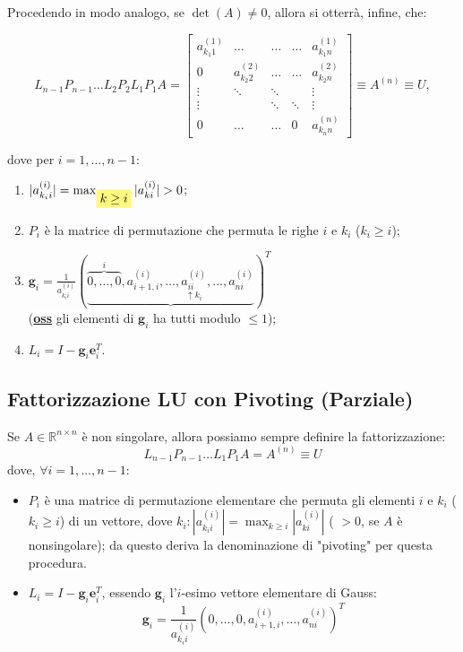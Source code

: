 Procedendo in modo analogo, se $\det(A) \neq 0$, allora si otterrà, infine, che:

\[
L_{n-1} P_{n-1} \dots L_2 P_2 L_1 P_1 A = 
\begin{bmatrix}
a_{k_1 1}^{(1)} & \dots & \dots & \dots & a_{k_1 n}^{(1)} \\
0 & a_{k_2 2}^{(2)} & \dots & \dots & a_{k_2 n}^{(2)} \\
\vdots & \ddots & \ddots & & \vdots \\
\vdots & & \ddots & \ddots & \vdots \\
0 & \dots & \dots & 0 & a_{k_n n}^{(n)}
\end{bmatrix}
\equiv A^{(n)} \equiv U,
\]

dove per $i = 1, \dots, n-1$:

\begin{enumerate}
    \item $|a_{k_i i}^{(i)}| = \max_{\colorbox{yellow!50}{$k \ge i$}} |a_{k i}^{(i)}| > 0$;
    \item $P_i$ è la matrice di permutazione che permuta le righe $i$ e $k_i$ (\colorbox{yellow!50}{$k_i \ge i$});
    \item $\mathbf{g}_i = \frac{1}{a_{k_i i}^{(i)}} ( \underbrace{\overbrace{0, \dots, 0}^{i}, a_{i+1, i}^{(i)}, \dots, \underset{\uparrow k_i}{a_{ii}^{(i)}}, \dots, a_{ni}^{(i)}}_{} )^T$ \\
    (\colorbox{white}{\textbf{\underline{oss}} gli elementi di $\mathbf{g}_i$ ha tutti modulo $\le 1$});
    \item $L_i = I - \mathbf{g}_i \mathbf{e}_i^T$.
\end{enumerate}


\subsection{Fattorizzazione LU con Pivoting (Parziale)}
Se $A \in \mathbb{R}^{n \times n}$ è non singolare, allora possiamo sempre definire la fattorizzazione:
\begin{equation} \label{eq:algoritmo_passi}
L_{n-1} P_{n-1} \dots L_1 P_1 A = A^{(n)} \equiv U
\end{equation}
dove, $\forall i = 1, \dots, n-1$:
\begin{itemize}
    \item $P_i$ è una matrice di permutazione elementare che permuta gli elementi $i$ e $k_i$ ($k_i \ge i$) di un vettore, dove $k_i : |a_{k_i i}^{(i)}| = \max_{k \ge i} |a_{ki}^{(i)}|$ ( $>0$, se $A$ è nonsingolare); da questo deriva la denominazione di "pivoting" per questa procedura.
    \item $L_i = I - \mathbf{g}_i \mathbf{e}_i^T$, essendo $\mathbf{g}_i$ l'$i$-esimo vettore elementare di Gauss:
    $$ \mathbf{g}_i = \frac{1}{a_{k_i i}^{(i)}} (0, \dots, 0, a_{i+1, i}^{(i)}, \dots, a_{ni}^{(i)})^T $$
\end{itemize}

